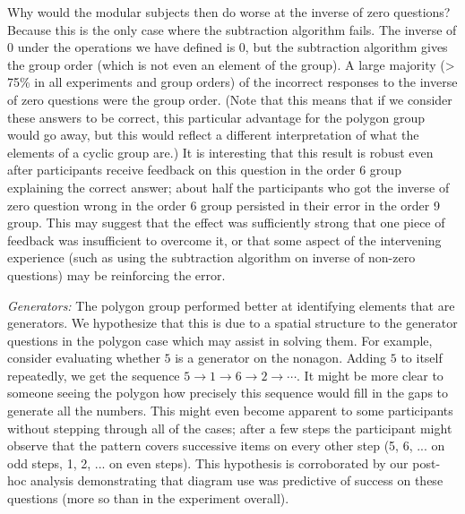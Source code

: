 \documentclass[man,10pt]{apa6}
\begin{document}
Why would the modular subjects then do worse at the inverse of zero questions? Because this is the only case where the subtraction algorithm fails. The inverse of 0 under the operations we have defined is 0, but the subtraction algorithm gives the group order (which is not even an element of the group). A large majority (> 75\% in all experiments and group orders) of the incorrect responses to the inverse of zero questions were the group order. (Note that this means that if we consider these answers to be correct, this particular advantage for the polygon group would go away, but this would reflect a different interpretation of what the elements of a cyclic group are.) It is interesting that this result is robust even after participants receive feedback on this question in the order 6 group explaining the correct answer; about half the participants who got the inverse of zero question wrong in the order 6 group persisted in their error in the order 9 group. This may suggest that the effect was sufficiently strong that one piece of feedback was insufficient to overcome it, or that some aspect of the intervening experience (such as using the subtraction algorithm on inverse of non-zero questions) may be reinforcing the error. \par
\textit{Generators:} The polygon group performed better at identifying elements that are generators. We hypothesize that this is due to a spatial structure to the generator questions in the polygon case which may assist in solving them. For example, consider evaluating whether $5$ is a generator on the nonagon. Adding $5$ to itself repeatedly, we get the sequence $5 \rightarrow 1 \rightarrow 6 \rightarrow 2 \rightarrow \cdots$. It might be more clear to someone seeing the polygon how precisely this sequence would fill in the gaps to generate all the numbers. This might even become apparent to some participants without stepping through all of the cases; after a few steps the participant might observe that the pattern covers successive items on every other step (5, 6, ... on odd steps, 1, 2, ... on even steps). This hypothesis is corroborated by our post-hoc analysis demonstrating that diagram use was predictive of success on these questions (more so than in the experiment overall). 
\end{document}

